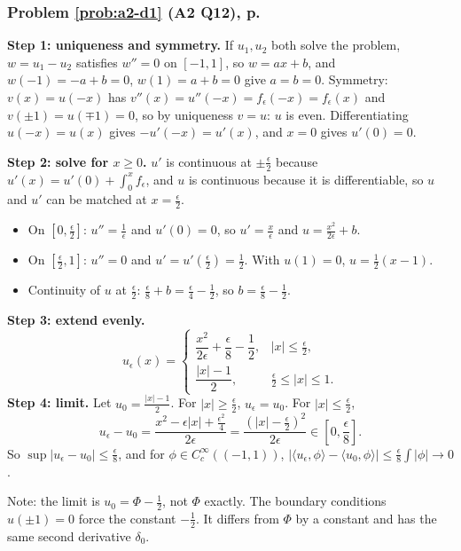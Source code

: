 \documentclass{article}
\newcommand{\ip}[2]{\langle #1, #2 \rangle}
\begin{document}
\subsubsection*{Problem \ref{prob:a2-d1} (A2 Q12), p.~\pageref{prob:a2-d1}}
\textbf{Step 1: uniqueness and symmetry.} If $u_1, u_2$ both solve the problem, $w = u_1 - u_2$ satisfies $w'' = 0$ on $[-1,1]$, so $w = ax + b$, and $w(-1) = -a + b = 0$, $w(1) = a + b = 0$ give $a = b = 0$. Symmetry: $v(x) = u(-x)$ has $v''(x) = u''(-x) = f_\epsilon(-x) = f_\epsilon(x)$ and $v(\pm1) = u(\mp1) = 0$, so by uniqueness $v = u$: $u$ is even. Differentiating $u(-x) = u(x)$ gives $-u'(-x) = u'(x)$, and $x = 0$ gives $u'(0) = 0$.\par
\textbf{Step 2: solve for $x \geq 0$.} $u'$ is continuous at $\pm\frac\epsilon2$ because $u'(x) = u'(0) + \int_0^xf_\epsilon$, and $u$ is continuous because it is differentiable, so $u$ and $u'$ can be matched at $x = \frac\epsilon2$.
\begin{itemize}
    \item On $[0,\frac\epsilon2]$: $u'' = \frac1\epsilon$ and $u'(0) = 0$, so $u' = \frac x\epsilon$ and $u = \frac{x^2}{2\epsilon} + b$.
    \item On $[\frac\epsilon2, 1]$: $u'' = 0$ and $u' = u'(\frac\epsilon2) = \frac12$. With $u(1) = 0$, $u = \frac12(x - 1)$.
    \item Continuity of $u$ at $\frac\epsilon2$: $\frac\epsilon8 + b = \frac\epsilon4 - \frac12$, so $b = \frac\epsilon8 - \frac12$.
\end{itemize}
\textbf{Step 3: extend evenly.}
\begin{equation*}
    u_\epsilon(x) = \begin{cases} \dfrac{x^2}{2\epsilon} + \dfrac\epsilon8 - \dfrac12, & |x| \leq \frac\epsilon2, \\[2mm] \dfrac{|x| - 1}{2}, & \frac\epsilon2 \leq |x| \leq 1. \end{cases}
\end{equation*}
\textbf{Step 4: limit.} Let $u_0 = \frac{|x| - 1}{2}$. For $|x| \geq \frac\epsilon2$, $u_\epsilon = u_0$. For $|x| \leq \frac\epsilon2$,
\begin{equation*}
    u_\epsilon - u_0 = \frac{x^2 - \epsilon|x| + \frac{\epsilon^2}{4}}{2\epsilon} = \frac{(|x| - \frac\epsilon2)^2}{2\epsilon} \in \left[0, \frac\epsilon8\right].
\end{equation*}
So $\sup|u_\epsilon - u_0| \leq \frac\epsilon8$, and for $\phi \in C_c^\infty((-1,1))$, $|\ip{u_\epsilon}{\phi} - \ip{u_0}{\phi}| \leq \frac\epsilon8\int|\phi| \to 0$.\par
Note: the limit is $u_0 = \Phi - \frac12$, not $\Phi$ exactly. The boundary conditions $u(\pm1) = 0$ force the constant $-\frac12$. It differs from $\Phi$ by a constant and has the same second derivative $\delta_0$.
\end{document}
